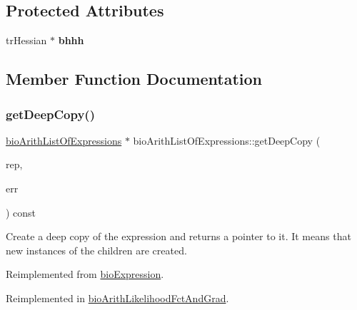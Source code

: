 \subsection*{Protected Attributes}
\begin{DoxyCompactItemize}
\item 
\mbox{\label{classbio_arith_list_of_expressions_ad1c126ae53fc25558593738125005374}} 
tr\+Hessian $\ast$ {\bfseries bhhh}
\end{DoxyCompactItemize}


\subsection{Member Function Documentation}
\mbox{\label{classbio_arith_list_of_expressions_af13c0c6710776c02d3f7c0e27d5cd724}} 
\subsubsection{\texorpdfstring{get\+Deep\+Copy()}{getDeepCopy()}}
{\footnotesize\ttfamily \hyperlink{classbio_arith_list_of_expressions}{bio\+Arith\+List\+Of\+Expressions} $\ast$ bio\+Arith\+List\+Of\+Expressions\+::get\+Deep\+Copy (\begin{DoxyParamCaption}\item[{\hyperlink{classbio_expression_repository}{bio\+Expression\+Repository} $\ast$}]{rep,  }\item[{pat\+Error $\ast$\&}]{err }\end{DoxyParamCaption}) const\hspace{0.3cm}{\ttfamily [virtual]}}

Create a deep copy of the expression and returns a pointer to it. It means that new instances of the children are created. 

Reimplemented from \hyperlink{classbio_expression_a4ee1b8add634078a02eaae26cd40dcc8}{bio\+Expression}.



Reimplemented in \hyperlink{classbio_arith_likelihood_fct_and_grad_a053e08511308e3c8a3e572f5c5f8f019}{bio\+Arith\+Likelihood\+Fct\+And\+Grad}.

